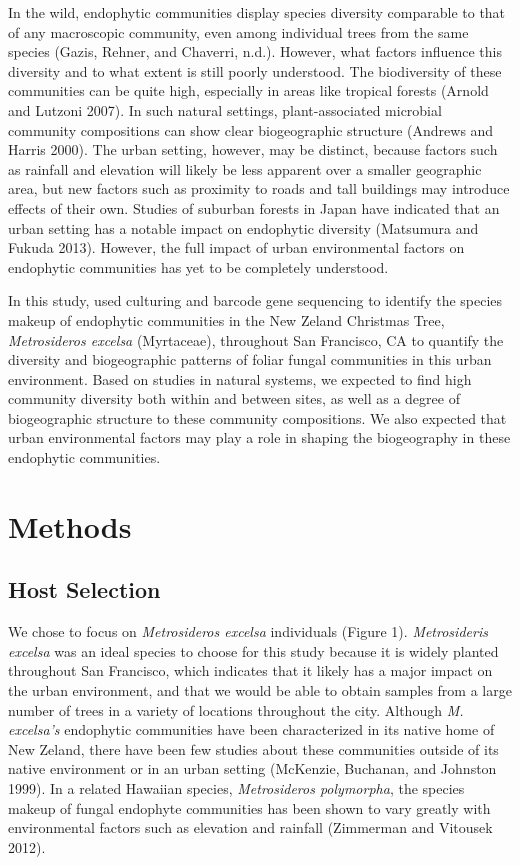 \documentclass[fleqn,10pt,lineno]{wlpeerj} %
\begin{document}
In the wild, endophytic communities display species diversity comparable to that of any macroscopic community, even among individual trees from the same species (Gazis, Rehner, and Chaverri, n.d.). However, what factors influence this diversity and to what extent is still poorly understood. The biodiversity of these communities can be quite high, especially in areas like tropical forests (Arnold and Lutzoni 2007). In such natural settings, plant-associated microbial community compositions can show clear biogeographic structure (Andrews and Harris 2000). The urban setting, however, may be distinct, because factors such as rainfall and elevation will likely be less apparent over a smaller geographic area, but new factors such as proximity to roads and tall buildings may introduce effects of their own. Studies of suburban forests in Japan have indicated that an urban setting has a notable impact on endophytic diversity (Matsumura and Fukuda 2013). However, the full impact of urban environmental factors on endophytic communities has yet to be completely understood.

In this study, used culturing and barcode gene sequencing to identify the species makeup of endophytic communities in the New Zeland Christmas Tree, \emph{Metrosideros excelsa} (Myrtaceae), throughout San Francisco, CA to quantify the diversity and biogeographic patterns of foliar fungal communities in this urban environment. Based on studies in natural systems, we expected to find high community diversity both within and between sites, as well as a degree of biogeographic structure to these community compositions. We also expected that urban environmental factors may play a role in shaping the biogeography in these endophytic communities.

\hypertarget{methods}{%
\section*{Methods}\label{methods}}

\hypertarget{host-selection}{%
\subsection*{Host Selection}\label{host-selection}}

We chose to focus on \emph{Metrosideros excelsa} individuals (Figure 1). \emph{Metrosideris excelsa} was an ideal species to choose for this study because it is widely planted throughout San Francisco, which indicates that it likely has a major impact on the urban environment, and that we would be able to obtain samples from a large number of trees in a variety of locations throughout the city. Although \emph{M. excelsa's} endophytic communities have been characterized in its native home of New Zeland, there have been few studies about these communities outside of its native environment or in an urban setting (McKenzie, Buchanan, and Johnston 1999). In a related Hawaiian species, \emph{Metrosideros polymorpha}, the species makeup of fungal endophyte communities has been shown to vary greatly with environmental factors such as elevation and rainfall (Zimmerman and Vitousek 2012).
\end{document}
